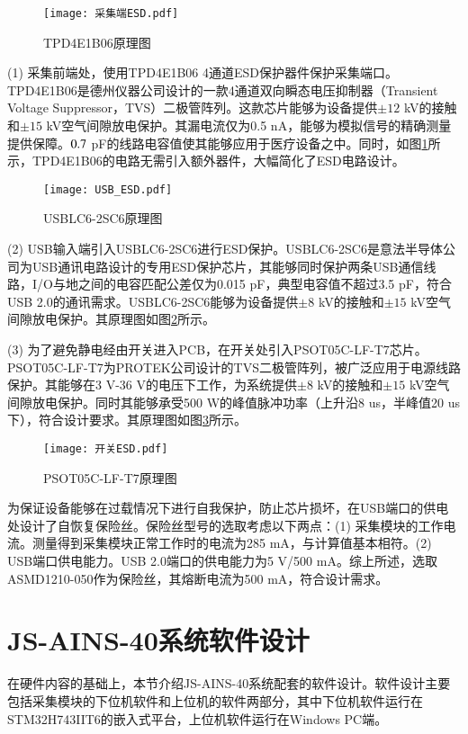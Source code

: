 \begin{figure}[!h]
	\centering
	\texttt{[image: 采集端ESD.pdf]}
	\caption{TPD4E1B06原理图} 
	\label{fig2-16}
\end{figure}

(1) 采集前端处，使用TPD4E1B06 4通道ESD保护器件保护采集端口。TPD4E1B06是德州仪器公司设计的一款4通道双向瞬态电压抑制器（Transient Voltage Suppressor，TVS）二极管阵列。这款芯片能够为设备提供$\pm12$ kV的接触和$\pm15$ kV空气间隙放电保护。其漏电流仅为0.5 nA，能够为模拟信号的精确测量提供保障。$\rm 0.7$ pF的线路电容值使其能够应用于医疗设备之中。同时，如图\ref{fig2-16}所示，TPD4E1B06的电路无需引入额外器件，大幅简化了ESD电路设计。

\begin{figure}[h]
	\centering
	\texttt{[image: USB\_ESD.pdf]}
	\caption{USBLC6-2SC6原理图} 
	\label{fig2-17}
\end{figure}


(2) USB输入端引入USBLC6-2SC6进行ESD保护。USBLC6-2SC6是意法半导体公司为USB通讯电路设计的专用ESD保护芯片，其能够同时保护两条USB通信线路，I/O与地之间的电容匹配公差仅为0.015 pF，典型电容值不超过3.5 pF，符合USB 2.0的通讯需求。USBLC6-2SC6能够为设备提供$\pm8$ kV的接触和$\pm15$ kV空气间隙放电保护。其原理图如图\ref{fig2-17}所示。

(3) 为了避免静电经由开关进入PCB，在开关处引入PSOT05C-LF-T7芯片。PSOT05C-LF-T7为PROTEK公司设计的TVS二极管阵列，被广泛应用于电源线路保护。其能够在3 V-36 V的电压下工作，为系统提供$\pm8$ kV的接触和$\pm15$ kV空气间隙放电保护。同时其能够承受500 W的峰值脉冲功率（上升沿8 us，半峰值20 us下），符合设计要求。其原理图如图\ref{fig2-18}所示。

\begin{figure}[h]
	\centering
	\texttt{[image: 开关ESD.pdf]}
	\caption{PSOT05C-LF-T7原理图} 
	\label{fig2-18}
\end{figure}

为保证设备能够在过载情况下进行自我保护，防止芯片损坏，在USB端口的供电处设计了自恢复保险丝。保险丝型号的选取考虑以下两点：(1) 采集模块的工作电流。测量得到采集模块正常工作时的电流为285 mA，与计算值基本相符。(2) USB端口供电能力。USB 2.0端口的供电能力为5 V/500 mA。综上所述，选取ASMD1210-050作为保险丝，其熔断电流为500 mA，符合设计需求。



\section{JS-AINS-40系统软件设计}
在硬件内容的基础上，本节介绍JS-AINS-40系统配套的软件设计。软件设计主要包括采集模块的下位机软件和上位机的软件两部分，其中下位机软件运行在STM32H743IIT6的嵌入式平台，上位机软件运行在Windows PC端。

